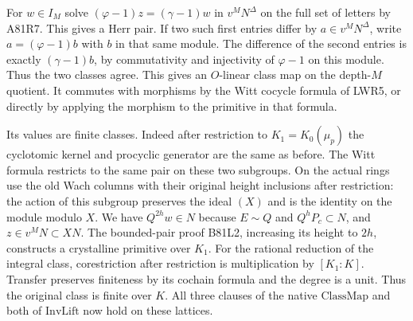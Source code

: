 For $w\in I_M$ solve $(\varphi-1)z=(\gamma-1)w$ in
$v^M N^\Delta$ on the full set of letters by A81R7. This
gives a Herr pair. If two such first entries differ by
$a\in v^M N^\Delta$, write $a=(\varphi-1)b$ with $b$ in that
same module. The difference of the second entries is exactly
$(\gamma-1)b$, by commutativity and injectivity of $\varphi-1$
on this module. Thus the two classes agree. This gives an
$O$-linear class map on the depth-$M$ quotient. It commutes
with morphisms by the Witt cocycle formula of LWR5, or directly
by applying the morphism to the primitive in that formula.

Its values are finite classes. Indeed after restriction to
$K_1=K_0(\mu_p)$ the cyclotomic kernel and procyclic generator
are the same as before. The Witt formula restricts to the same
pair on these two subgroups. On the actual rings use the old
Wach columns with their original height inclusions after
restriction: the action of this subgroup preserves the ideal $(X)$ and is the
identity on the module modulo $X$. We have $Q^{2h}w\in N$ because $E\sim Q$ and
$Q^hP_c\subset N$, and $z\in v^M N\subset XN$.
The bounded-pair proof B81L2, increasing its height to $2h$,
constructs a crystalline primitive over $K_1$. For the rational
reduction of the integral class, corestriction after restriction
is multiplication by $[K_1:K]$. Transfer preserves finiteness
by its cochain formula and the degree is a unit. Thus the
original class is finite over $K$. All three clauses of the
native $\mathrm{ClassMap}$ and both of $\mathrm{InvLift}$ now
hold on these lattices.
